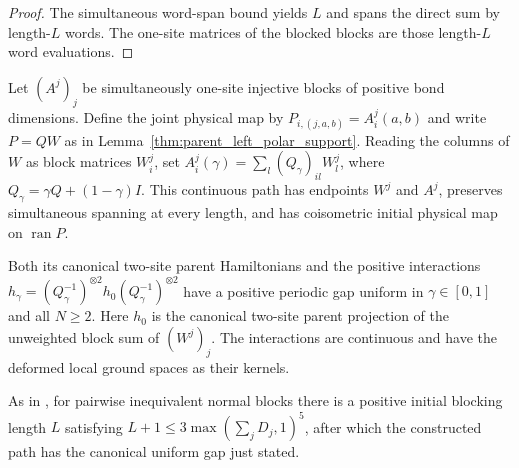 \begin{proof}
    \leanok
    The simultaneous word-span bound yields $L$ and spans the direct
    sum by length-$L$ words. The one-site matrices of the blocked blocks
    are those length-$L$ word evaluations.
\end{proof}

\begin{lemma}
    \label{thm:constructed_isometric_deformation_gap}
    \leanok
    Let $(A^j)_j$ be simultaneously one-site injective blocks of positive
    bond dimensions. Define the joint physical map by
    $P_{i,(j,a,b)}=A^j_i(a,b)$ and write $P=QW$ as in
    Lemma~\ref{thm:parent_left_polar_support}. Reading the columns of
    $W$ as block matrices $W^j_i$, set
    $A^j_i(\gamma)=\sum_l(Q_\gamma)_{il}W^j_l$, where
    $Q_\gamma=\gamma Q+(1-\gamma)I$.
    This continuous path has endpoints $W^j$ and $A^j$, preserves
    simultaneous spanning at every length, and has coisometric initial
    physical map on $\operatorname{ran}P$.

    Both its canonical two-site parent Hamiltonians and the positive
    interactions $h_\gamma=(Q_\gamma^{-1})^{\otimes2}
        h_0(Q_\gamma^{-1})^{\otimes2}$ have a positive periodic gap uniform
    in $\gamma\in[0,1]$ and all $N\geq2$. Here $h_0$ is the canonical
    two-site parent projection of the unweighted block sum of $(W^j)_j$.
    The interactions are continuous and have the deformed local
    ground spaces as their kernels.

    As in \cite[lines~575--625, Appendix~A]{Schuch2011Phases}, for pairwise
    inequivalent normal blocks there is a positive initial blocking length $L$
    satisfying $L+1\leq3\max(\sum_jD_j,1)^5$, after which the constructed path
    has the canonical uniform gap just stated.
\end{lemma}

